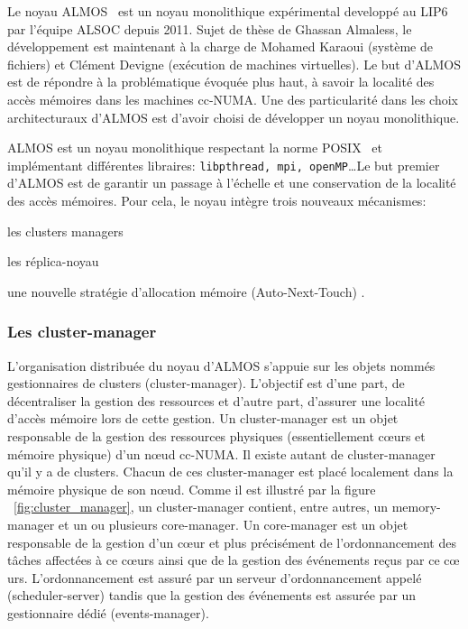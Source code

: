     Le noyau ALMOS~\cite{almaless2011almos} est un noyau monolithique
    expérimental developpé au LIP6 par l'équipe ALSOC depuis 2011. Sujet de
    thèse de Ghassan Almaless, le développement est maintenant à la charge de
    Mohamed Karaoui (système de fichiers) et Clément Devigne (exécution de
    machines virtuelles). Le but d'ALMOS est de répondre à la problématique
    évoquée plus haut, à savoir la localité des accès mémoires dans les machines
    cc-NUMA. Une des particularité dans les
    choix architecturaux d'ALMOS est d'avoir choisi de développer un noyau
    monolithique.

    ALMOS est un noyau monolithique respectant la norme POSIX~\cite{posix2013}
    et implémentant différentes libraires: \texttt{libpthread, mpi,
      openMP}\ldots Le but premier d'ALMOS est de garantir un passage à
    l'échelle et une conservation de la localité des accès mémoires. Pour cela,
    le noyau intègre trois nouveaux mécanismes: \benumline \item les clusters
    managers \item les réplica-noyau \item une nouvelle stratégie d'allocation
    mémoire (Auto-Next-Touch) \eenumline.

    
    \subsubsection{Les cluster-manager}

      L'organisation distribuée du noyau d’ALMOS s’appuie sur les objets nommés
      gestionnaires de clusters (cluster-manager). L’objectif est d’une part, de
      décentraliser la gestion des ressources et d’autre part, d’assurer une
      localité d’accès mémoire lors de cette gestion. Un cluster-manager est un
      objet responsable de la gestion des ressources physiques (essentiellement
      c\oe urs et mémoire physique) d’un nœud cc-NUMA. Il existe autant de
      cluster-manager qu’il y a de clusters. Chacun de ces cluster-manager est
      placé localement dans la mémoire physique de son n\oe ud. Comme il est
      illustré par la figure ~\ref{fig:cluster_manager}, un cluster-manager
      contient, entre autres, un memory-manager et un ou plusieurs core-manager.
      Un core-manager est un objet responsable de la gestion d’un c\oe ur et
      plus précisément de l'ordonnancement des tâches affectées à ce c\oe urs
      ainsi que de la gestion des événements reçus par ce c\oe
      urs. L'ordonnancement est assuré par un serveur d'ordonnancement appelé
      (scheduler-server) tandis que la gestion des événements est assurée par un
      gestionnaire dédié (events-manager).


